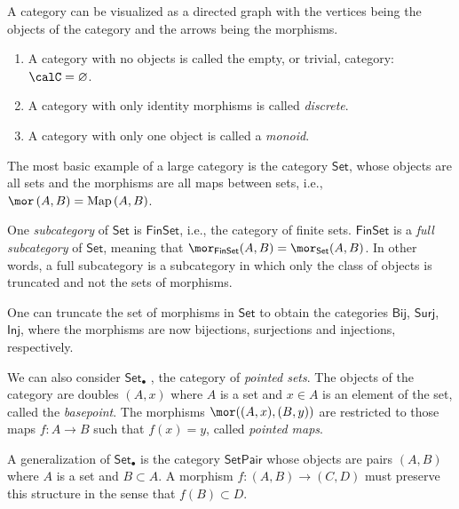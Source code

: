 A category can be visualized as a directed graph with the vertices
being the objects of the category and the arrows being the morphisms.
\begin{example}
\begin{enumerate}
    \item A category with no objects is called the empty, or trivial, category: $\calC=\varnothing$.
    \item A category with only identity morphisms is called \emph{discrete}.
    \item A category with only one object is called a \emph{monoid}.
\end{enumerate}
    
\end{example}

\begin{example}
    The most basic example of a large category is the category $\mathsf{Set}$,
    whose objects are all sets and the morphisms are all maps between
    sets, i.e., $\mor\left(A,B\right)=\mathrm{Map}\left(A,B\right)$. 

    One \emph{subcategory} of $\mathsf{Set}$ is $\mathsf{FinSet}$,
    i.e., the category of finite sets. $\mathsf{FinSet}$ is a \emph{full
    subcategory} of $\mathsf{Set}$, meaning that $\mor_{\mathsf{FinSet}}(A,B)=\mor_{\mathsf{Set}}(A,B)$.
    In other words, a full subcategory is a subcategory in which only
    the class of objects is truncated and not the sets of morphisms.
\end{example}
%
\begin{example}
    One can truncate the set of morphisms in $\mathsf{Set}$ to obtain
    the categories $\mathsf{Bij}$, $\mathsf{Surj}$, $\mathsf{Inj}$,
    where the morphisms are now bijections, surjections and injections,
    respectively.
\end{example}
%
\begin{example}
    We can also consider $\mathsf{Set}_{\bullet}$ , the category of \emph{pointed sets}. The objects of the category are doubles $(A,x)$ where $A$
    is a set and $x\in A$ is an element of the set, called the \emph{basepoint}.
    The morphisms $\mor((A,x),(B,y))$ are restricted to those maps $f:A\rightarrow B$
    such that $f(x)=y$, called \emph{pointed maps}.
\end{example}
%
\begin{example}
A generalization of $\mathsf{Set}_{\bullet}$ is the category $\mathsf{SetPair}$
whose objects are pairs $(A,B)$ where $A$ is a set and $B\subset A$.
A morphism $f:(A,B)\rightarrow(C,D)$ must preserve this structure
in the sense that $f(B)\subset D$.
\end{example}
